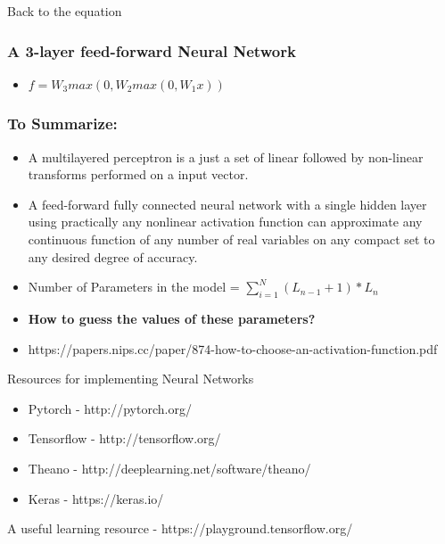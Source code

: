 \documentclass[11pt]{article}
\providecommand{\tightlist}{%
      \setlength{\itemsep}{0pt}\setlength{\parskip}{0pt}}
\begin{document}
    Back to the equation

\hypertarget{a-3-layer-feed-forward-neural-network}{%
\subsubsection{A 3-layer feed-forward Neural
Network}\label{a-3-layer-feed-forward-neural-network}}

\begin{itemize}
\tightlist
\item
  \(f = W_3max(0, W_2 max(0, W_1x))\)
\end{itemize}

\hypertarget{to-summarize}{%
\subsubsection{To Summarize:}\label{to-summarize}}

\begin{itemize}
\tightlist
\item
  A multilayered perceptron is a just a set of linear followed by
  non-linear transforms performed on a input vector.
\item
  A feed-forward fully connected neural network with a single hidden
  layer using practically any nonlinear activation function can
  approximate any continuous function of any number of real variables on
  any compact set to any desired degree of accuracy.
\item
  Number of Parameters in the model = \(\sum_{i=1}^{N} (L_{n-1}+1)*L_n\)
\item
  \textbf{How to guess the values of these parameters?}
\item
  https://papers.nips.cc/paper/874-how-to-choose-an-activation-function.pdf
\end{itemize}

    Resources for implementing Neural Networks

\begin{itemize}
\tightlist
\item
  Pytorch - http://pytorch.org/
\item
  Tensorflow - http://tensorflow.org/
\item
  Theano - http://deeplearning.net/software/theano/
\item
  Keras - https://keras.io/
\end{itemize}

A useful learning resource - https://playground.tensorflow.org/
\end{document}
